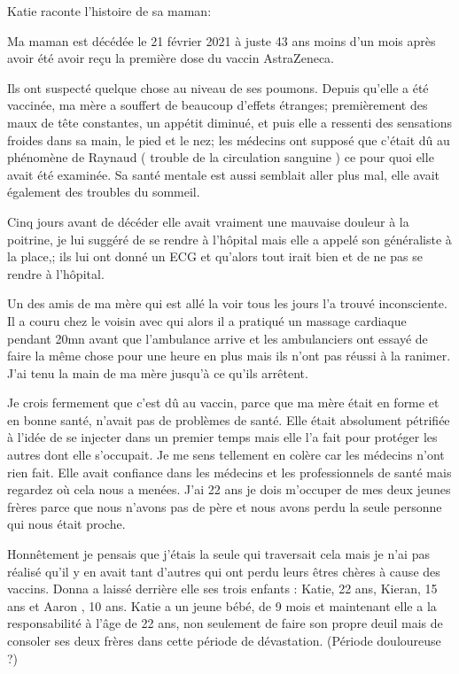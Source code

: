 Katie raconte l’histoire de sa maman:
  
Ma maman est décédée le 21 février 2021 à juste 43 ans moins d’un mois après
avoir été avoir reçu la première dose du vaccin AstraZeneca.

Ils ont suspecté quelque chose au niveau de ses poumons. Depuis qu’elle a été
vaccinée, ma mère a souffert de beaucoup d’effets étranges; premièrement des
maux de tête constantes, un appétit diminué, et puis elle a ressenti des
sensations froides dans sa main, le pied et le nez; les médecins ont supposé que
c’était dû au phénomène de Raynaud ( trouble de la circulation sanguine ) ce
pour quoi elle avait été examinée. Sa santé mentale est aussi semblait aller
plus mal, elle avait également des troubles du sommeil.

Cinq jours avant de décéder elle avait vraiment une mauvaise douleur à la
poitrine, je lui suggéré de se rendre à l’hôpital mais elle a appelé son
généraliste à la place,; ils lui ont donné un ECG et qu’alors tout irait bien et
de ne pas se rendre à l’hôpital.

Un des amis de ma mère qui est allé la voir tous les jours l’a trouvé
inconsciente. Il a couru chez le voisin avec qui alors il a pratiqué un massage
cardiaque pendant 20mn avant que l’ambulance arrive et les ambulanciers ont
essayé de faire la même chose pour une heure en plus mais ils n’ont pas réussi à
la ranimer. J’ai tenu la main de ma mère jusqu’à ce qu’ils arrêtent.

Je crois fermement que c’est dû au vaccin, parce que ma mère était en forme et
en bonne santé, n’avait pas de problèmes de santé. Elle était absolument
pétrifiée à l’idée de se injecter dans un premier temps mais elle l’a fait pour
protéger les autres dont elle s’occupait. Je me sens tellement en colère car les
médecins n’ont rien fait. Elle avait confiance dans les médecins et les
professionnels de santé mais regardez où cela nous a menées. J’ai 22 ans je dois
m’occuper de mes deux jeunes frères parce que nous n’avons pas de père et nous
avons perdu la seule personne qui nous était proche.

Honnêtement je pensais que j’étais la seule qui traversait cela mais je n’ai pas
réalisé qu’il y en avait tant d’autres qui ont perdu leurs êtres chères à cause
des vaccins. Donna a laissé derrière elle ses trois enfants : Katie, 22 ans,
Kieran, 15 ans et Aaron , 10 ans. Katie a un jeune bébé, de 9 mois et maintenant
elle a la responsabilité à l’âge de 22 ans, non seulement de faire son propre
deuil mais de consoler ses deux frères dans cette période de
dévastation. (Période douloureuse ?)
